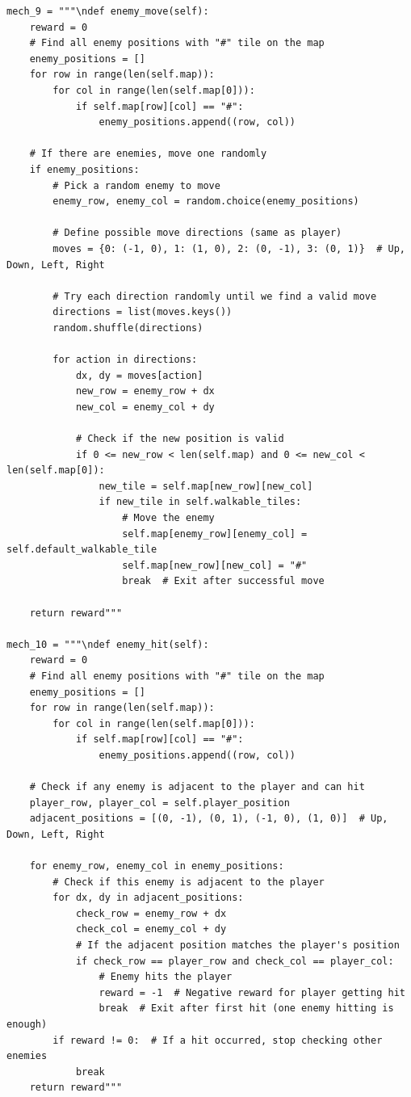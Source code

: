 \documentclass{article} %
\begin{document}
\begin{lstlisting}
mech_9 = """\ndef enemy_move(self):
    reward = 0
    # Find all enemy positions with "#" tile on the map
    enemy_positions = []
    for row in range(len(self.map)):
        for col in range(len(self.map[0])):
            if self.map[row][col] == "#":
                enemy_positions.append((row, col))
    
    # If there are enemies, move one randomly
    if enemy_positions:
        # Pick a random enemy to move
        enemy_row, enemy_col = random.choice(enemy_positions)
        
        # Define possible move directions (same as player)
        moves = {0: (-1, 0), 1: (1, 0), 2: (0, -1), 3: (0, 1)}  # Up, Down, Left, Right
        
        # Try each direction randomly until we find a valid move
        directions = list(moves.keys())
        random.shuffle(directions)
        
        for action in directions:
            dx, dy = moves[action]
            new_row = enemy_row + dx
            new_col = enemy_col + dy
            
            # Check if the new position is valid
            if 0 <= new_row < len(self.map) and 0 <= new_col < len(self.map[0]):
                new_tile = self.map[new_row][new_col]
                if new_tile in self.walkable_tiles:
                    # Move the enemy
                    self.map[enemy_row][enemy_col] = self.default_walkable_tile
                    self.map[new_row][new_col] = "#"
                    break  # Exit after successful move
    
    return reward"""

mech_10 = """\ndef enemy_hit(self):
    reward = 0
    # Find all enemy positions with "#" tile on the map
    enemy_positions = []
    for row in range(len(self.map)):
        for col in range(len(self.map[0])):
            if self.map[row][col] == "#":
                enemy_positions.append((row, col))
    
    # Check if any enemy is adjacent to the player and can hit
    player_row, player_col = self.player_position
    adjacent_positions = [(0, -1), (0, 1), (-1, 0), (1, 0)]  # Up, Down, Left, Right
    
    for enemy_row, enemy_col in enemy_positions:
        # Check if this enemy is adjacent to the player
        for dx, dy in adjacent_positions:
            check_row = enemy_row + dx
            check_col = enemy_col + dy
            # If the adjacent position matches the player's position
            if check_row == player_row and check_col == player_col:
                # Enemy hits the player
                reward = -1  # Negative reward for player getting hit
                break  # Exit after first hit (one enemy hitting is enough)
        if reward != 0:  # If a hit occurred, stop checking other enemies
            break
    return reward"""
\end{lstlisting}
\end{document}
